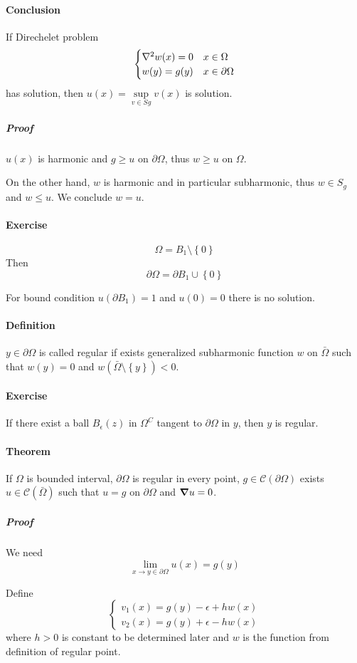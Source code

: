 \paragraph{Conclusion}
If Direchelet problem
$$\begin{cases}
\laplacian{w}(x) = 0 & x\in \Omega\\
w(y) = g(y) & x \in \partial \Omega
\end{cases}$$
has solution, then $u(x)=\sup\limits_{v\in S g} v(x)$ is solution.
\subparagraph{Proof}
$u(x)$ is harmonic and $g \geq u$ on $\partial \Omega$, thus $w\geq u$ on $\Omega$.

On the other hand, $w$ is harmonic and in particular subharmonic, thus $w\in S_g$ and $w\leq u$. We conclude $w=u$.
\paragraph{Exercise}
$$\Omega = B_1 \setminus \left\{ 0 \right\}$$
Then
$$\partial \Omega = \partial B_1 \cup \left\{ 0 \right\}$$

For bound condition $u(\partial B_1) = 1$ and $u(0)=0$ there is no solution.
\paragraph{Definition}
$y\in \partial \Omega$ is called regular if exists generalized subharmonic function $w$ on $\bar{\Omega}$ such that $w(y)=0$ and $w(\bar{\Omega} \setminus \left\{y\right\}) < 0$.
\paragraph{Exercise}
If there exist a ball $B_\epsilon(z)$ in $\Omega^C$ tangent to $\partial \Omega$ in $y$, then $y$ is regular. 
\paragraph{Theorem} If $\Omega$ is bounded interval, $\partial \Omega $ is regular in every point, $g\in \mathcal{C}(\partial \Omega)$  exists $u \in \mathcal{C}(\bar{\Omega})$ such that $u=g$ on  $\partial \Omega $ and $\grad{u}  = 0$.
\subparagraph{Proof}
We need
$$\lim_{x \to y \in \partial \Omega} u(x) = g(y)$$

Define 
$$\begin{cases}
v_1(x) = g(y) -\epsilon + hw(x)\\
v_2(x) = g(y) + \epsilon - hw(x)
\end{cases}$$
where $h>0$ is constant to be determined later and $w$ is the function from definition of regular point.

